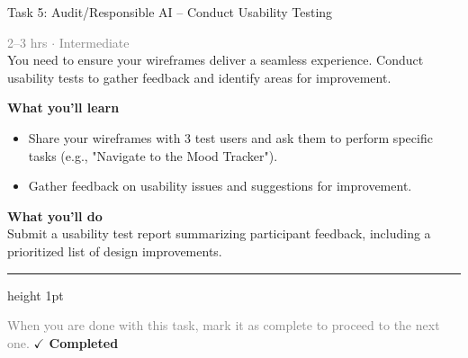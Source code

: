 \documentclass[10pt,a4paper]{article}
\begin{document}
\begin{taskbox}{Task 5: Audit/Responsible AI – Conduct Usability Testing}

    {\small \textcolor{gray}{2--3 hrs $\cdot$ Intermediate}}\\[12pt]

      
You need to ensure your wireframes deliver a seamless experience. Conduct usability tests to gather feedback and identify areas for improvement.


\vspace{8pt}
{\large \textbf{\textcolor{brandLight}{What you'll learn}}}\\[4pt]  
\begin{itemize}
    \item Share your wireframes with 3 test users and ask them to perform specific tasks (e.g., "Navigate to the Mood Tracker").  
    \item Gather feedback on usability issues and suggestions for improvement.
\end{itemize}

\vspace{8pt}
{\large \textbf{\textcolor{brandLight}{What you'll do}}}\\[4pt]  
Submit a usability test report summarizing participant feedback, including a prioritized list of design improvements.\par

    \vspace{16pt}

    \textcolor{cardBorder}{\hrule height 1pt}\vspace{8pt}

    \small \textcolor{gray}{When you are done with this task, mark it as complete to proceed to the next one.} \hfill \textbf{\textcolor{brandDark}{$\checkmark$ Completed}}

\end{taskbox}
\end{document}
